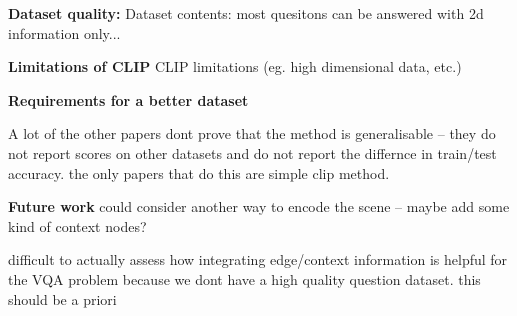 \textbf{Dataset quality:}
Dataset contents: most quesitons can be answered with 2d information only...

\textbf{Limitations of CLIP}
CLIP limitations (eg. high dimensional data, etc.)

\textbf{Requirements for a better dataset}

A lot of the other papers dont prove that the method is generalisable -- they do not report scores on other datasets and do not report the differnce in train/test accuracy. the only papers that do this are simple clip method.

\textbf{Future work}
could consider another way to encode the scene -- maybe add some kind of context nodes?

difficult to actually assess how integrating edge/context information is helpful for the VQA problem because we dont have a high quality question dataset. this should be a priori